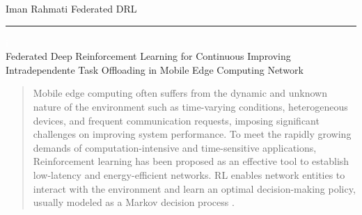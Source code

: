 \documentclass[12pt]{article}
\begin{document}
	

	
%

\begin{center} 
	
	
	\vspace{-17mm}
	
	\large Iman Rahmati  \hfill Federated DRL \vspace{1mm} \hrule
	
	\vspace{-1mm}
	
	
	
	
	\textcolor{white}{i} \\ \LARGE Federated Deep Reinforcement Learning for Continuous Improving Intradependente Task Offloading in Mobile Edge Computing Network\vspace{6mm}\\
	
\end{center}

	



\vspace{-8mm}

\begin{abstract}
	\vspace{-2mm}
	\noindent
	Mobile edge computing often suffers from the dynamic and unknown nature of the environment such as time-varying conditions, heterogeneous devices, and frequent communication requests, imposing significant challenges on improving system performance. To meet the rapidly growing demands of computation-intensive and time-sensitive applications, Reinforcement learning \cite{mnih2015human} has been proposed as an effective tool to establish low-latency and energy-efficient networks. RL enables network entities to interact with the environment and learn an optimal decision-making policy, usually modeled as a Markov decision process \cite{puterman2014markov}.
\end{abstract}



	
\vspace{4mm}
\end{document}

